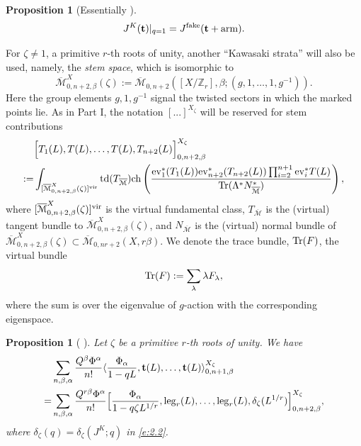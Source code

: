 \documentclass[11pt]{amsart}
\newtheorem{proposition}[theorem]{Proposition}
\newtheorem*{main theorem*}{Main Theorem}
\theoremstyle{remark}
\numberwithin{equation}{section}
\newcommand{\M}{\overline{\mathcal{M}}}
\newcommand{\vir}{{\rm vir}}
\newcommand{\ev}{{\rm ev}}
\newcommand{\td}{{\rm td}}
\newcommand{\ch}{{\rm ch}}
\newcommand{\Tr}{{\rm Tr}}
\newcommand{\fake}{{\rm fake}}
\newcommand{\KK}{{K}}
\begin{document}
\begin{proposition}[Essentially {\cite[Proposition~1]{Givental_Tonita_2011}}]\label{prop_head_fake}
\[
J^{\KK}(\mathbf{t})|_{q=1} = J^{\fake}(\mathbf{t} + {\rm arm}).
\]
\end{proposition}
\quad


For $\zeta\neq 1$, a primitive $r$-th roots of unity, another ``Kawasaki strata'' will also be used, namely, the \emph{stem space}, which is isomorphic to
\[
 \M_{0,n+2,\beta}^X(\zeta) := \M_{0,n+2} \left( [X/\mathbb{Z}_r], \beta; (g,1,\dots,1,g^{-1}) \right) .   
\]
Here the group elements $g, 1, g^{-1}$ signal the twisted sectors in which the marked points lie. As in Part I, the notation $[...]^{X_{\zeta}}$ will be reserved for stem contributions
\begin{equation} \label{e:stem}
\begin{split}
    &\Big[ T_1(L), T(L),\dots, T(L), T_{n+2}(L) \Big]^{X_{\zeta}}_{0,n+2,\beta}
    \\
 := &\int_{[\M_{0,n+2,\beta}^X(\zeta)]^{\vir}} \td( T_{\M} ) \ch \left( 
    \frac{ \ev_1^* (T_1(L)) \ev_{n+2}^* (T_{n+2}(L)) \prod_{i=2}^{n+1} \ev_i^* T(L) }
    {\Tr (\Lambda^* N^*_{\M})}  \right),
\end{split}
\end{equation}
where $[\M_{0,n+2,\beta}^X(\zeta)]^{\vir}$ is the virtual fundamental class, $T_{\M}$ is the (virtual) tangent bundle to $\M_{0,n+2,\beta}^X(\zeta)$, and $N_{\M}$ is the (virtual) normal bundle of $\M_{0,n+2,\beta}^X(\zeta) \subset \M_{0,nr+2}(X,r\beta)$. We denote the trace bundle, $\Tr(F)$, the virtual bundle
\[
\Tr (F) := \sum_{\lambda} \lambda F_{\lambda},
\]
where the sum is over the eigenvalue of $g$-action with the corresponding eigenspace. 

\begin{proposition} [{ \cite[\S~8]{Givental_Tonita_2011} }] \label{Prop_Stem_inv}
Let $\zeta$ be a primitive $r$-th roots of unity.
We have
\[
\begin{split}
    & \sum_{n,\beta,\alpha}  \frac{Q^{\beta} \Phi^{\alpha}}{n!}\langle \frac{\Phi_{\alpha}}{1-qL}, \mathbf{t}(L),\dots,\mathbf{t}(L)  \rangle^{X_{\zeta}}_{0,n+1,\beta} 
    \\
   = & \sum_{n,\beta,\alpha} \frac{Q^{r\beta}\Phi^{\alpha}}{n!} \Big[ \frac{\Phi_{\alpha}}{1-q\zeta L^{1/r}}, {\rm leg}_{r}(L),\dots, {\rm leg}_{r}(L),  \delta_{\zeta}(L^{1/r}) \Big]^{X_{\zeta}}_{0,n+2,\beta},
\end{split}
\]
where $\delta_{\zeta}(q) =\delta_{\zeta}(J^K; q)$ in \eqref{e:2.2}.
\end{proposition}
\end{document}
